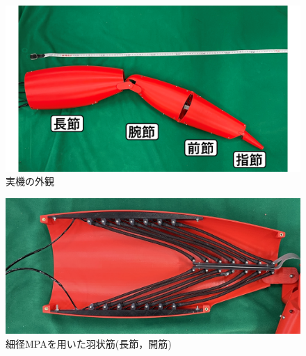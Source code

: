 \documentclass{jarticle}
\begin{document}

\begin{figure}[t]
  \centering
  \includegraphics[scale=0.15]{image/jikki.png}
  \vspace{-2mm}
  \caption{実機の外観}
  \label{fig:jikki}
\end{figure}


\begin{figure}[t!]
    \centering
    \includegraphics[scale=0.045]{image/crabmuscle.jpg}
    \vspace{-2mm}
    \caption{細径MPAを用いた羽状筋(長節，開筋)}
    \label{fig:muscle}
\end{figure}


\begin{table}[t]
  \centering
  \vspace{-2mm}
  \caption{実際の蟹と実機の可動域比較}
  \vspace{1mm}
  \label{tab:kadouiki}
\end{table}
\end{document}
